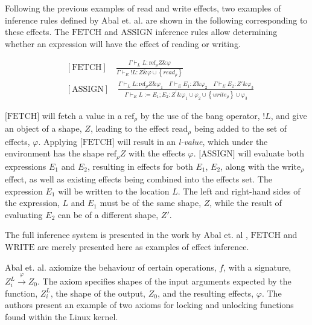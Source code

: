 \newpar Following the previous examples of read and write effects, two examples of inference rules defined by Abal et. al. are shown in the following corresponding to these effects. The $\text{FETCH}$ and $\text{ASSIGN}$ inference rules allow determining whether an expression will have the effect of reading or writing. 

\begin{equation*}
\begin{aligned}
    &[\text{FETCH}] \quad \frac{\Gamma \vdash_{L} L: \text{ref}_{\rho} Z \& \varphi}{\Gamma \vdash_{E} {!L}: Z \& \varphi \cup\left\{r e a d_{\rho}\right\}}\\
    &[\text{ASSIGN}] \quad \frac{\Gamma \vdash_{L} L: \mathrm{ref}_{\rho} Z \& \varphi_{1} \quad \Gamma \vdash_{E} E_{1}: Z \& \varphi_{2} \quad \Gamma \vdash_{E} E_{2}: Z' \& \varphi_{3}}{\Gamma \vdash_{E} L:=E_{1} ; E_{2}: Z^{\prime} \& \varphi_{1} \cup \varphi_{2} \cup\left\{w r i t e_{\rho}\right\} \cup \varphi_{3}}
\end{aligned}
\end{equation*}

\newpar $\text{[FETCH]}$ will fetch a value in a $\text{ref}_\rho$ by the use of the bang operator, $!L$, and give an object of a shape, $Z$, leading to the effect $\text{read}_\rho$ being added to the set of effects, $\varphi$. Applying $\text{[FETCH]}$ will result in an \textit{l-value}, which under the environment has the shape $\text{ref}_\rho Z$ with the effects $\varphi$. $\text{[ASSIGN]}$ will evaluate both expressions $E_1$ and $E_2$, resulting in effects for both $E_1$, $E_2$, along with the $\text{write}_\rho$ effect, as well as existing effects being combined into the effects set. The expression $E_1$ will be written to the location $L$. The left and right-hand sides of the expression, $L$ and $E_1$ must be of the same shape, $Z$, while the result of evaluating $E_2$ can be of a different shape, $Z'$.

\newpar The full inference system is presented in the work by Abal et. al \cite{Abal2017EffectiveBF}, $\text{FETCH}$ and $\text{WRITE}$ are merely presented here as examples of effect inference. 

\newpar Abal et. al. axiomize the behaviour of certain operations, $f$, with a signature, $Z_{i}^{L} \stackrel{\varphi}{\rightarrow} Z_0$. The axiom specifies shapes of the input arguments expected by the function, $Z_{i}^{L}$, the shape of the output, $Z_0$, and the resulting effects, $\varphi$. The authors present an example of two axioms for locking and unlocking functions found within the Linux kernel. 

